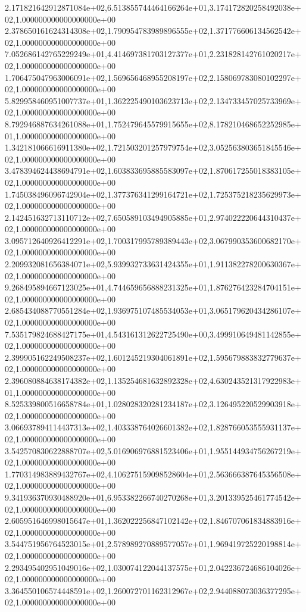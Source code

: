 2.171821642912871084e+02,6.513855744464166264e+01,3.174172820258492038e+02,1.000000000000000000e+00
2.378650161624314308e+02,1.790954783989896555e+02,1.371776606134562542e+02,1.000000000000000000e+00
7.052686142765229249e+01,4.414697381703127377e+01,2.231828142761020217e+02,1.000000000000000000e+00
1.706475047963006091e+02,1.569656468955208197e+02,2.158069783080102297e+02,1.000000000000000000e+00
5.829958460951007737e+01,1.362225490103623713e+02,2.134733457025733969e+02,1.000000000000000000e+00
8.792946887634261088e+01,1.752479645579915655e+02,8.178210468652252985e+01,1.000000000000000000e+00
1.342181066616911380e+02,1.721503201257979754e+02,3.052563803651845546e+02,1.000000000000000000e+00
3.478394624438694791e+02,1.603833695885583097e+02,1.870617255018383105e+02,1.000000000000000000e+00
1.745038496096742904e+02,1.377376341299164721e+02,1.725375218235629973e+02,1.000000000000000000e+00
2.142451632713110712e+02,7.650589103494905885e+01,2.974022220644310437e+02,1.000000000000000000e+00
3.095712640926412291e+02,1.700317995789389443e+02,3.067990353600682170e+02,1.000000000000000000e+00
2.209932081656384071e+02,5.939932733631424355e+01,1.911382278200630367e+02,1.000000000000000000e+00
9.268495894667123025e+01,4.744659656888231325e+01,1.876276423284704151e+02,1.000000000000000000e+00
2.685434088770551284e+02,1.936975107485534053e+01,3.065179620434286107e+02,1.000000000000000000e+00
7.535179824688427175e+01,4.543161312622725490e+00,3.499910649481142855e+02,1.000000000000000000e+00
2.399905162249508237e+02,1.601245219304061891e+02,1.595679883832779637e+02,1.000000000000000000e+00
2.396080884638174382e+02,1.135254681632892328e+02,4.630243521317922983e+01,1.000000000000000000e+00
8.525339800516658784e+01,1.028028320281234187e+02,3.126495220529903918e+02,1.000000000000000000e+00
3.066937894114437313e+02,1.403338764026601382e+02,1.828766053555931137e+02,1.000000000000000000e+00
3.542570830622888707e+02,5.016906976881523406e+01,1.955144934756267219e+02,1.000000000000000000e+00
1.770314983889432767e+02,4.106275159098528604e+01,2.563666387645356508e+02,1.000000000000000000e+00
9.341936370930488920e+01,6.953382266740270268e+01,3.201339525461774542e+02,1.000000000000000000e+00
2.605951646998015647e+01,1.362022256847102142e+02,1.846707061834883916e+02,1.000000000000000000e+00
3.544751956764523015e+01,2.578989270889577057e+01,1.969419725220198814e+02,1.000000000000000000e+00
2.293495402951049016e+02,1.030074122044137575e+01,2.042236724686104026e+02,1.000000000000000000e+00
3.364550106574448591e+02,1.260072701162312967e+02,2.944088073036377295e+02,1.000000000000000000e+00
